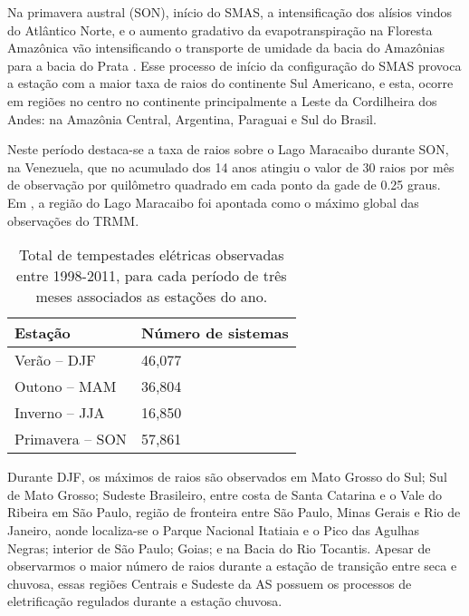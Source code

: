 Na primavera austral (SON), início do SMAS, a intensificação dos alísios vindos do Atlântico Norte, e o aumento gradativo da evapotranspiração na Floresta Amazônica vão intensificando o transporte de umidade da bacia do Amazônias para a bacia do Prata \cite{marengo2004}.  Esse processo de início da configuração do SMAS provoca a estação com a maior taxa de raios do continente Sul Americano, e esta, ocorre em regiões no centro no continente principalmente a Leste da Cordilheira dos Andes: na Amazônia Central, Argentina, Paraguai e Sul do Brasil.


Neste período destaca-se a taxa de raios sobre o Lago Maracaibo durante SON, na Venezuela, que no acumulado dos 14 anos atingiu o valor de 30 raios por mês de observação por quilômetro quadrado em cada ponto da gade de 0.25 graus. Em , a região do Lago Maracaibo foi apontada como o máximo global das observações do TRMM. 


\begin{table}[!h]
\caption{Total de tempestades elétricas observadas entre 1998-2011, para cada período de três meses associados as estações do ano.}
\label{EstacaoQtd}
\centering
\small
\newcommand{\grayline}{\rowcolor[gray]{.88}}
\renewcommand {\tabularxcolumn }[1]{ >{\arraybackslash }m{#1}}
\begin{tabularx}{\textwidth}{W W} %
\hline  \hline 
Estação & Número de sistemas \\[1.5pt]  
 \hline
\grayline Verão -- DJF & 46,077 \\[1.5pt]
Outono -- MAM & 36,804\\[1.5pt]
\grayline Inverno -- JJA  & 16,850\\[1.5pt] 
Primavera -- SON & 57,861\\[1.5pt]
\hline 
\end{tabularx}
\end{table}


Durante DJF, os máximos de raios são observados em Mato Grosso do Sul; Sul de Mato Grosso; Sudeste Brasileiro, entre costa de Santa Catarina e o Vale do Ribeira em São Paulo, região de fronteira entre São Paulo, Minas Gerais e Rio de Janeiro, aonde localiza-se o Parque Nacional Itatiaia e o Pico das Agulhas Negras; interior de São Paulo; Goias; e na Bacia do Rio Tocantis. Apesar de observarmos o maior número de raios durante a estação de transição entre seca e chuvosa, essas regiões Centrais e Sudeste da AS possuem os processos de eletrificação regulados durante a estação chuvosa. 

